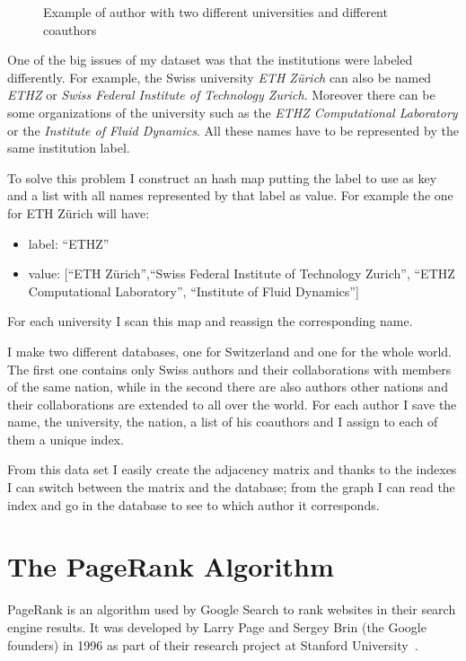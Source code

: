 \documentclass[]{usiinfbachelorproject}
\begin{document}
\begin{figure}
\begin{center}
\begin{tikzpicture}[x=0.75pt,y=0.75pt,yscale=-0.7,xscale=0.7]
\end{tikzpicture}
\caption{Example of author with two different universities and different coauthors} \label{fig:twoUni}
\end{center}
\end{figure}

One of the big issues of my dataset was that the institutions were labeled differently. For example, the Swiss university \textit{ETH Z\"{u}rich} can also be named \textit{ETHZ} or \textit{Swiss Federal Institute of Technology Zurich}.  Moreover there can be some organizations of the university such as the \textit{ETHZ Computational Laboratory} or the \textit{Institute of Fluid Dynamics}. All these names have to be represented by the same institution label. 

To solve this problem I construct an hash map putting the label to use as key and a list with all names represented by that label as value. For example the one for ETH Z\"{u}rich will have: 
\begin{itemize}
\item label:  ``ETHZ''
\item value:  [``ETH Z\"{u}rich'',``Swiss Federal Institute of Technology Zurich'', ``ETHZ Computational Laboratory'', ``Institute of Fluid Dynamics'']
\end{itemize}

For each university I scan this map and reassign the corresponding name.

I make two different databases, one for Switzerland and one for the whole world. The first one contains only Swiss authors and their collaborations with members of the same nation, while in the second there are also authors other nations and their collaborations are extended to all over the world. For each author I save the name, the university, the nation, a list of his coauthors and I assign to each of them a unique index. 

From this data set I easily create the adjacency matrix and thanks to the indexes I can switch between the matrix and the database; from the graph I can read the index and go in the database to see to which author it corresponds.





\section{The PageRank Algorithm} \label{sec:pagerank} 
PageRank is an algorithm used by Google Search to rank websites in their search engine results. It was developed by  Larry Page and  Sergey Brin (the Google founders) in 1996 as part of their research project at Stanford University~\cite{pagerank}.
\end{document}
